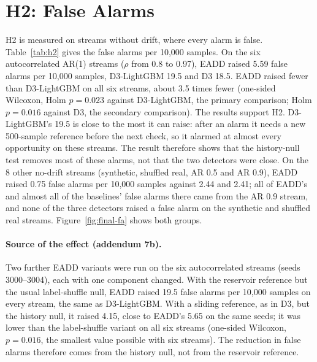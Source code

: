 \section{H2: False Alarms}
\label{sec:exp2}

H2 is measured on streams without drift, where every alarm is false. Table~\ref{tab:h2} gives the false alarms per 10,000 samples. On the six autocorrelated AR(1) streams ($\rho$ from 0.8 to 0.97), EADD raised 5.59 false alarms per 10,000 samples, D3-LightGBM 19.5 and D3 18.5. EADD raised fewer than D3-LightGBM on all six streams, about 3.5 times fewer (one-sided Wilcoxon, Holm $p = 0.023$ against D3-LightGBM, the primary comparison; Holm $p = 0.016$ against D3, the secondary comparison). The results support H2. D3-LightGBM's 19.5 is close to the most it can raise: after an alarm it needs a new 500-sample reference before the next check, so it alarmed at almost every opportunity on these streams. The result therefore shows that the history-null test removes most of these alarms, not that the two detectors were close. On the 8 other no-drift streams (synthetic, shuffled real, AR 0.5 and AR 0.9), EADD raised 0.75 false alarms per 10,000 samples against 2.44 and 2.41; all of EADD's and almost all of the baselines' false alarms there came from the AR 0.9 stream, and none of the three detectors raised a false alarm on the synthetic and shuffled real streams. Figure~\ref{fig:final-fa} shows both groups.

\paragraph{Source of the effect (addendum 7b).} Two further EADD variants were run on the six autocorrelated streams (seeds 3000--3004), each with one component changed. With the reservoir reference but the usual label-shuffle null, EADD raised 19.5 false alarms per 10,000 samples on every stream, the same as D3-LightGBM. With a sliding reference, as in D3, but the history null, it raised 4.15, close to EADD's 5.65 on the same seeds; it was lower than the label-shuffle variant on all six streams (one-sided Wilcoxon, $p = 0.016$, the smallest value possible with six streams). The reduction in false alarms therefore comes from the history null, not from the reservoir reference.

